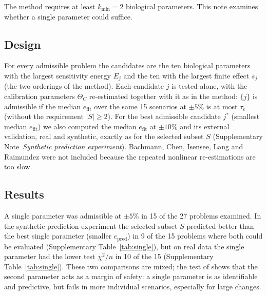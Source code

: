 
The method requires at least $k_{\min}=2$ biological parameters. This note examines whether a single parameter could suffice.

\subsection*{Design}
For every admissible problem the candidates are the ten biological parameters with the largest sensitivity energy $E_j$ and the ten with the largest finite effect $s_j$ (the two orderings of the method). Each candidate $j$ is tested alone, with the calibration parameters $\Theta_C$ re-estimated together with it as in the method: $\{j\}$ is admissible if the median $e_{\mathrm{fit}}$ over the same 15 scenarios at $\pm5\%$ is at most $\tau_e$ (without the requirement $|S|\ge2$). For the best admissible candidate $j^\ast$ (smallest median $e_{\mathrm{fit}}$) we also computed the median $e_{\mathrm{fit}}$ at $\pm10\%$ and its external validation, real and synthetic, exactly as for the selected subset $S$ (Supplementary Note~\emph{Synthetic prediction experiment}). Bachmann, Chen, Isensee, Lang and Raimundez were not included because the repeated nonlinear re-estimations are too slow.

\subsection*{Results}
A single parameter was admissible at $\pm5\%$ in 15 of the 27 problems examined. In the synthetic prediction experiment the selected subset $S$ predicted better than the best single parameter (smaller $e_{\mathrm{pred}}$) in 9 of the 15 problems where both could be evaluated (Supplementary Table~\ref{tab:single}), but on real data the single parameter had the lower test $\chi^2/n$ in 10 of the 15 (Supplementary Table~\ref{tab:single}). These two comparisons are mixed; the test of  shows that the second parameter acts as a margin of safety: a single parameter is as identifiable and predictive, but fails in more individual scenarios, especially for large changes.

